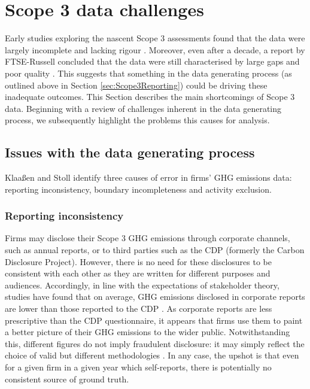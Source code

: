 \documentclass[12pt,twoside]{report}
\begin{document}
\section{Scope 3 data challenges}\label{sec:Scope3Challenges}

Early studies exploring the nascent Scope 3 assessments found that the data were largely incomplete and lacking rigour \cite{DownieStubbs2013}. Moreover, even after a decade, a report by FTSE-Russell concluded that the data were still characterised by large gaps and poor quality \cite{ftserussell2024}. This suggests that something in the data generating process (as outlined above in Section \ref{sec:Scope3Reporting}) could be driving these inadequate outcomes. This Section describes the main shortcomings of Scope 3 data. Beginning with a review of challenges inherent in the data generating process, we subsequently highlight the problems this causes for analysis. 

\subsection{Issues with the data generating process}\label{sec:DataGenIssues}

Klaaßen and Stoll \cite{klassenstoll2021} identify three causes of error in firms' GHG emissions data: reporting inconsistency, boundary incompleteness and activity exclusion. 

\subsubsection{Reporting inconsistency}

Firms may disclose their Scope 3 GHG emissions through corporate channels, such as annual reports, or to third parties such as the CDP (formerly the Carbon Disclosure Project). However, there is no need for these disclosures to be consistent with each other as they are written for different purposes and audiences. Accordingly, in line with the expectations of stakeholder theory, studies have found that on average, GHG emissions disclosed in corporate reports are lower than those reported to the CDP \cite{depoers2016, klassenstoll2021}. As corporate reports are less prescriptive than the CDP questionnaire, it appears that firms use them to paint a better picture of their GHG emissions to the wider public. Notwithstanding this, different figures do not imply fraudulent disclosure: it may simply reflect the choice of valid but different methodologies \cite{depoers2016}. In any case, the upshot is that even for a given firm in a given year which self-reports, there is potentially no consistent source of ground truth. 
\end{document}
